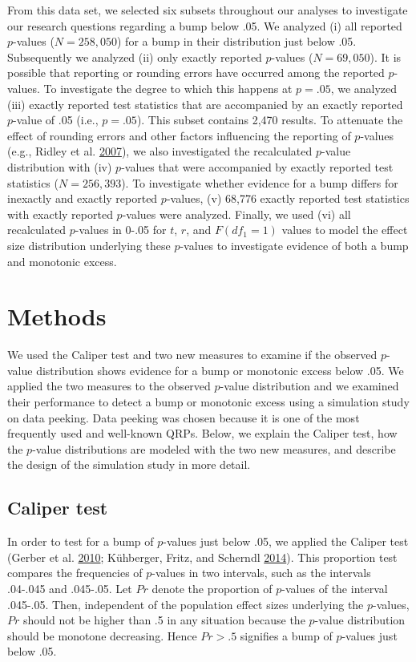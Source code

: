 \documentclass[a5paper]{book}
\begin{document}
From this data set, we selected six subsets throughout our analyses to
investigate our research questions regarding a bump below .05. We
analyzed (i) all reported \(p\)-values (\(N=258,050\)) for a bump in
their distribution just below .05. Subsequently we analyzed (ii) only
exactly reported \(p\)-values (\(N=69,050\)). It is possible that
reporting or rounding errors have occurred among the reported
\(p\)-values. To investigate the degree to which this happens at
\(p=.05\), we analyzed (iii) exactly reported test statistics that are
accompanied by an exactly reported \(p\)-value of .05 (i.e., \(p=.05\)).
This subset contains 2,470 results. To attenuate the effect of rounding
errors and other factors influencing the reporting of \(p\)-values
(e.g., Ridley et al.
\protect\hyperlink{ref-doi:10.1111ux2fj.1420-9101.2006.01291.x}{2007}),
we also investigated the recalculated \(p\)-value distribution with (iv)
\(p\)-values that were accompanied by exactly reported test statistics
(\(N=256,393\)). To investigate whether evidence for a bump differs for
inexactly and exactly reported \(p\)-values, (v) 68,776 exactly reported
test statistics with exactly reported \(p\)-values were analyzed.
Finally, we used (vi) all recalculated \(p\)-values in 0-.05 for \(t\),
\(r\), and \(F(df_1=1)\) values to model the effect size distribution
underlying these \(p\)-values to investigate evidence of both a bump and
monotonic excess.

\section{Methods}\label{methods}

We used the Caliper test and two new measures to examine if the observed
\(p\)-value distribution shows evidence for a bump or monotonic excess
below .05. We applied the two measures to the observed \(p\)-value
distribution and we examined their performance to detect a bump or
monotonic excess using a simulation study on data peeking. Data peeking
was chosen because it is one of the most frequently used and well-known
QRPs. Below, we explain the Caliper test, how the \(p\)-value
distributions are modeled with the two new measures, and describe the
design of the simulation study in more detail.

\subsection{Caliper test}\label{caliper-test}

In order to test for a bump of \(p\)-values just below .05, we applied
the Caliper test (Gerber et al.
\protect\hyperlink{ref-doi:10.1177ux2f1532673x09350979}{2010};
Kühberger, Fritz, and Scherndl
\protect\hyperlink{ref-doi:10.1371ux2fjournal.pone.0105825}{2014}). This
proportion test compares the frequencies of \(p\)-values in two
intervals, such as the intervals .04-.045 and .045-.05. Let \(Pr\)
denote the proportion of \(p\)-values of the interval .045-.05. Then,
independent of the population effect sizes underlying the \(p\)-values,
\(Pr\) should not be higher than .5 in any situation because the
\(p\)-value distribution should be monotone decreasing. Hence \(Pr>.5\)
signifies a bump of \(p\)-values just below .05.
\end{document}
